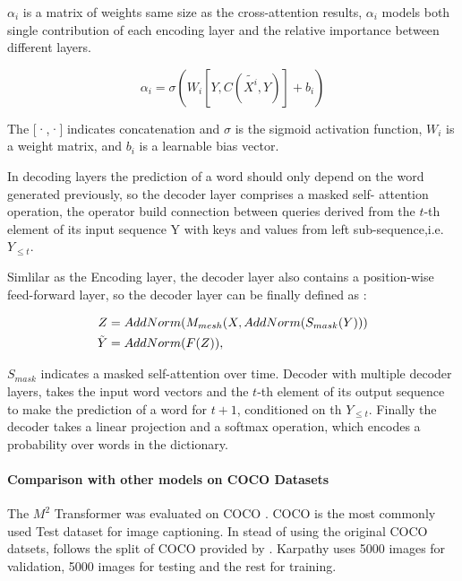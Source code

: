 \documentclass[
]{krantz}
\begin{document}
\(\alpha_i\) is a matrix of weights same size as the cross-attention results, \(\alpha_i\) models both single contribution of each encoding layer and the relative importance between different layers.\citep{cornia2020m2}

\begin{equation}
\alpha_i = \sigma(W_i [Y,C(\tilde{X^i}, Y)]+ b_i)
\end{equation}

The {[}·,·{]} indicates concatenation and \(\sigma\) is the sigmoid activation function, \(W_i\) is a weight matrix, and \(b_i\) is a learnable bias vector.\citep{cornia2020m2}

In decoding layers the prediction of a word should only depend on the word generated previously, so the decoder layer comprises a masked self- attention operation, the operator build connection between queries derived from the \(t\)-th element of its input sequence Y with keys and values from left sub-sequence,i.e.~\(Y_{≤t}\).

Simlilar as the Encoding layer, the decoder layer also contains a position-wise feed-forward layer, so the decoder layer can be finally defined as \citep{cornia2020m2}:

\begin{align}
Z &= AddNorm(M_{mesh}(X,AddNorm(S_{mask}(Y ))) \notag \\
\tilde{Y} &= AddNorm(F(Z)),
\end{align}

\(S_{mask}\) indicates a masked self-attention over time.\citep{cornia2020m2}
Decoder with multiple decoder layers, takes the input word vectors and the \(t\)-th element of its output sequence to make the prediction of a word for \(t + 1\), conditioned on th \(Y_{≤t}\). Finally the decoder takes a linear projection and a softmax operation, which encodes a probability over words in the dictionary.\citep{cornia2020m2}

\hypertarget{comparison-with-other-models-on-coco-datasets}{%
\paragraph{Comparison with other models on COCO Datasets}\label{comparison-with-other-models-on-coco-datasets}}

The \(M^2\) Transformer was evaluated on COCO \citep{mccoco}. COCO is the most commonly used Test dataset for image captioning. In stead of using the original COCO datsets, \citet{cornia2020m2} follows the split of COCO provided by \citet{karpthy1}. Karpathy uses 5000 images for validation, 5000 images for testing and the rest for training.
\end{document}
